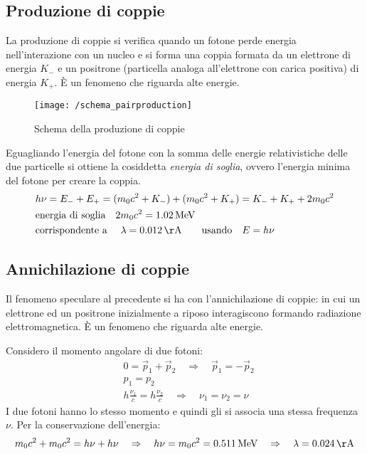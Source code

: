 \subsection{Produzione di coppie}
La produzione di coppie si verifica quando un fotone perde energia nell'interazione con un nucleo e si forma una coppia formata da un elettrone di energia $K_-$ e un positrone (particella analoga all'elettrone con carica positiva) di energia $K_+$.
È un fenomeno che riguarda alte energie.
\begin{figure}[h]
\centering
\texttt{[image: /schema\_pairproduction]}
\caption{Schema della produzione di coppie}
\end{figure}

Eguagliando l'energia del fotone con la somma delle energie relativistiche delle due particelle si ottiene la cosiddetta \textit{energia di soglia}, ovvero l'energia minima del fotone per creare la coppia.
\begin{equation}
\begin{split}
& h\nu = E_- + E_+ = (m_0 c^2 + K_-) + (m_0 c^2 + K_+) = K_- + K_+ + 2m_0 c^2 \\
&\mbox{energia di soglia} \quad 2m_0c^2 = \SI{1.02}{MeV} \\
&\mbox{corrispondente a } \quad \lambda = \SI{0.012}{\AA} \quad \quad \mbox{usando} \quad E = h\nu
\end{split}
\end{equation}


\subsection{Annichilazione di coppie}
Il fenomeno speculare al precedente si ha con l'annichilazione di coppie: in cui un elettrone ed un positrone inizialmente a riposo interagiscono formando radiazione elettromagnetica.
È un fenomeno che riguarda alte energie.

Considero il momento angolare di due fotoni:
\begin{equation}
\begin{split}
& 0 = \vec p_1 + \vec p_2 \quad \Rightarrow \quad \vec p_1 = - \vec p_2 \\
& p_1 = p_2 \\
& h \frac{ \nu_1}{c } = h \frac{ \nu_2}{c } \quad \Rightarrow \quad \nu_1 = \nu_2 = \nu
\end{split}
\end{equation}
I due fotoni hanno lo stesso momento e quindi gli si associa una stessa frequenza $\nu$.
Per la conservazione dell'energia:
\begin{equation}
m_0 c^2 + m_0 c^2 = h\nu + h\nu \quad \Rightarrow \quad 
h\nu = m_0 c^2 = \SI{0.511}{MeV} \quad \Rightarrow \quad
\lambda = \SI{0.024}{\AA}
\end{equation}






